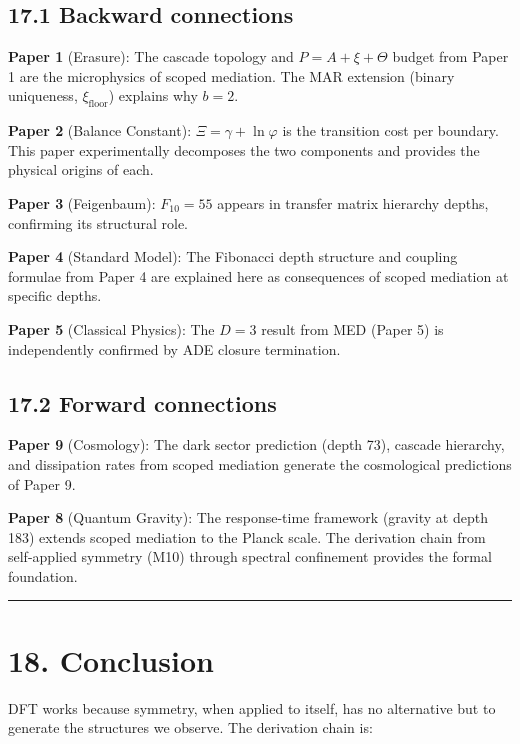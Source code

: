 \documentclass[11pt,a4paper]{article}
\begin{document}
\subsection*{17.1 Backward connections}

\textbf{Paper 1} (Erasure): The cascade topology and $P = A + \xi + \Theta$ budget from Paper 1 are the microphysics of scoped mediation. The MAR extension (binary uniqueness, $\xi_{\text{floor}}$) explains why $b = 2$.

\textbf{Paper 2} (Balance Constant): $\Xi = \gamma + \ln\varphi$ is the transition cost per boundary. This paper experimentally decomposes the two components and provides the physical origins of each.

\textbf{Paper 3} (Feigenbaum): $F_{10} = 55$ appears in transfer matrix hierarchy depths, confirming its structural role.

\textbf{Paper 4} (Standard Model): The Fibonacci depth structure and coupling formulae from Paper 4 are explained here as consequences of scoped mediation at specific depths.

\textbf{Paper 5} (Classical Physics): The $D = 3$ result from MED (Paper 5) is independently confirmed by ADE closure termination.

\subsection*{17.2 Forward connections}

\textbf{Paper 9} (Cosmology): The dark sector prediction (depth 73), cascade hierarchy, and dissipation rates from scoped mediation generate the cosmological predictions of Paper 9.

\textbf{Paper 8} (Quantum Gravity): The response-time framework (gravity at depth 183) extends scoped mediation to the Planck scale. The derivation chain from self-applied symmetry (M10) through spectral confinement provides the formal foundation.

\begin{center}\rule{0.5\linewidth}{0.4pt}\end{center}

\section*{18. Conclusion}

DFT works because symmetry, when applied to itself, has no alternative but to generate the structures we observe. The derivation chain is:
\end{document}
